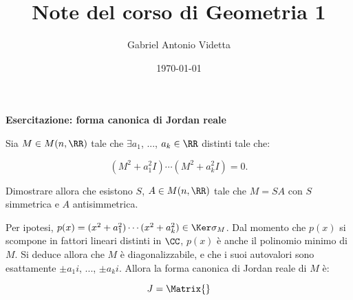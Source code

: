 \documentclass[11pt]{article}
\title{\textbf{Note del corso di Geometria 1}}
\author{Gabriel Antonio Videtta}
\date{\today}
\begin{document}
	
	\maketitle
	
	\begin{center}
		\Large \textbf{Esercitazione: forma canonica di Jordan reale}
	\end{center}

	\begin{exercise}
		Sia $M \in M(n, \RR)$ tale che $\exists a_1$, ..., $a_k \in \RR$ distinti
		tale che:
		
		\[ (M^2 + a_1^2 I) \cdots (M^2 + a_k^2 I) = 0. \]
		
		Dimostrare allora che esistono $S$, $A \in M(n, \RR)$ tale che
		$M = SA$ con $S$ simmetrica e $A$ antisimmetrica.
	\end{exercise}

	\begin{solution}
		Per ipotesi, $p(x) = (x^2+a_1^2) \cdots (x^2 + a_k^2) \in \Ker \sigma_M$.
		Dal momento che $p(x)$ si scompone in fattori lineari distinti in
		$\CC$, $p(x)$ è anche il polinomio minimo di $M$. Si deduce
		allora che $M$ è diagonalizzabile, e che i suoi autovalori sono
		esattamente $\pm a_1 i$, ..., $\pm a_k i$. Allora la forma
		canonica di Jordan reale di $M$ è:
		
		\[ J = \Matrix{} \]
	\end{solution}
\end{document}
